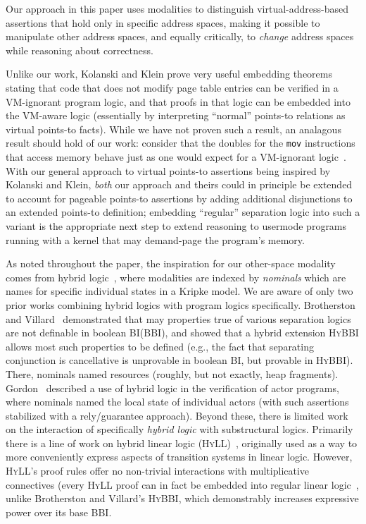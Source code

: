 \documentclass[acmsmall,screen,nonacm]{acmart}
\newcommand{\HyLL}{\textsc{HyLL}\xspace}
\newcommand{\BI}{\textsc{BI}\xspace}
\newcommand{\BBI}{\textsc{BBI}\xspace}
\newcommand{\HyBBI}{\textsc{HyBBI}\xspace}
\begin{document}
Our approach in this paper uses modalities to distinguish virtual-address-based assertions that hold only in specific 
address spaces, making it possible to manipulate other address spaces, and equally critically, to \emph{change} address 
spaces while reasoning about correctness. 

Unlike our work, Kolanski and Klein prove very useful embedding theorems stating that code that does not modify page table 
entries can be verified in a VM-ignorant program logic, and that proofs in that logic can be embedded into the VM-aware logic 
(essentially by interpreting ``normal'' points-to relations as virtual points-to facts). While we have not proven such a result,
an analagous result {should} hold of our work: consider that the doubles for the \texttt{mov} instructions
that access memory behave just as one would expect for a VM-ignorant logic~\cite{Chlipala2013Bedrock}.
With our general approach to virtual points-to assertions being inspired by Kolanski and Klein, \emph{both}
 our approach and theirs could in principle be extended to account for pageable points-to assertions by adding additional 
disjunctions to an extended points-to definition; embedding ``regular'' separation logic into such a variant
is the appropriate next step to extend reasoning to usermode programs running with a kernel that may demand-page the program's
memory.

As noted throughout the paper, the inspiration for our other-space modality comes from hybrid logic~\cite{areces2001hybrid,blackburn1995hybrid,gargov1993modal,goranko1996hierarchies},
where modalities are indexed by \emph{nominals} which are names for specific individual states in a Kripke model.
We are aware of only two prior works combining hybrid logics with program logics specifically. 
Brotherston and Villard~\cite{brotherston2014parametric} demonstrated that may properties true of various 
separation logics are not definable in boolean \BI (\BBI), and showed that a hybrid extension \HyBBI allows
most such properties to be defined (e.g., the fact that separating conjunction is cancellative is unprovable 
in boolean \BI, but provable in \HyBBI). There, nominals named resources 
(roughly, but not exactly, heap fragments). 
Gordon~\cite{gordon2019modal} described a use of hybrid logic in the verification of actor programs, 
where nominals named the local state of individual actors (with such assertions stabilized with a 
rely/guarantee approach). Beyond these, there is limited work on the interaction of specifically 
\emph{hybrid logic} with substructural logics. 
Primarily there is a line of work on hybrid linear logic (\HyLL)~\cite{despeyroux2014hybrid}, 
originally used as a way to more conveniently express aspects of transition systems in linear logic. 
However, \HyLL's proof rules offer no non-trivial interactions with multiplicative connectives 
(every \HyLL proof can in fact be embedded into regular linear logic~\cite{chaudhuri2019hybrid}, 
unlike Brotherston and Villard's \HyBBI, which demonstrably increases expressive power over its base \BBI.
\end{document}
